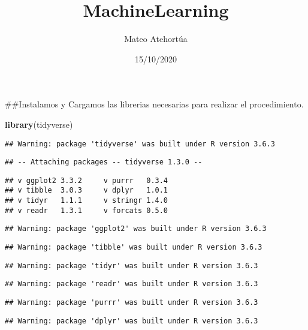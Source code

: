 \documentclass[
]{article}
\title{MachineLearning}
\author{Mateo Atehortúa}
\date{15/10/2020}
\newenvironment{Shaded}{\begin{snugshade}}{\end{snugshade}}
\newcommand{\KeywordTok}[1]{\textcolor[rgb]{0.13,0.29,0.53}{\textbf{#1}}}
\newcommand{\NormalTok}[1]{#1}
\begin{document}
\maketitle

\#\#Instalamos y Cargamos las librerias necesarias para realizar el
procedimiento.

\begin{Shaded}
\begin{Highlighting}[]
\KeywordTok{library}\NormalTok{(tidyverse)}
\end{Highlighting}
\end{Shaded}

\begin{verbatim}
## Warning: package 'tidyverse' was built under R version 3.6.3
\end{verbatim}

\begin{verbatim}
## -- Attaching packages -- tidyverse 1.3.0 --
\end{verbatim}

\begin{verbatim}
## v ggplot2 3.3.2     v purrr   0.3.4
## v tibble  3.0.3     v dplyr   1.0.1
## v tidyr   1.1.1     v stringr 1.4.0
## v readr   1.3.1     v forcats 0.5.0
\end{verbatim}

\begin{verbatim}
## Warning: package 'ggplot2' was built under R version 3.6.3
\end{verbatim}

\begin{verbatim}
## Warning: package 'tibble' was built under R version 3.6.3
\end{verbatim}

\begin{verbatim}
## Warning: package 'tidyr' was built under R version 3.6.3
\end{verbatim}

\begin{verbatim}
## Warning: package 'readr' was built under R version 3.6.3
\end{verbatim}

\begin{verbatim}
## Warning: package 'purrr' was built under R version 3.6.3
\end{verbatim}

\begin{verbatim}
## Warning: package 'dplyr' was built under R version 3.6.3
\end{verbatim}
\end{document}
